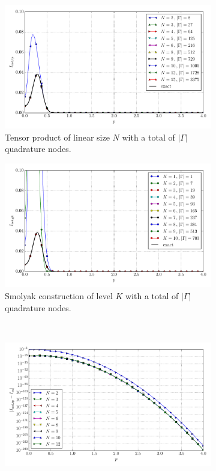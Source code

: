 \documentclass[a4paper,10pt]{article}
\begin{document}
\begin{figure}[ht!]
  \begin{subfigure}[t]{0.5\linewidth}
    \includegraphics[width=\linewidth]{./plots/tp_sg_3d_conv_p_(0,4,0)_(4,0,0)_val_nsd_tp.pdf}
    \caption{Tensor product of linear size $N$ with a total of $|\Gamma|$ quadrature nodes.}
    \label{fig:tp_sg_3d_conv_p_040_400_val_nsd_tp}
  \end{subfigure}
  \begin{subfigure}[t]{0.5\linewidth}
    \includegraphics[width=\linewidth]{./plots/tp_sg_3d_conv_p_(0,4,0)_(4,0,0)_val_nsd_gk.pdf}
    \caption{Smolyak construction of level $K$ with a total of $|\Gamma|$ quadrature nodes.}
    \label{fig:tp_sg_3d_conv_p_040_400_val_nsd_gk}
  \end{subfigure} \\
  \begin{subfigure}[t]{0.5\linewidth}
    \includegraphics[width=\linewidth]{./plots/tp_sg_3d_conv_p_(0,4,0)_(4,0,0)_err_nsd_tp.pdf}

\end{subfigure}
\end{figure}
\end{document}
